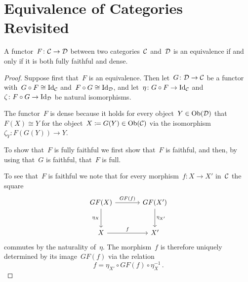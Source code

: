 \section{Equivalence of Categories Revisited}


\begin{theorem}
  A functor~$F \colon \mathcal{C} \to \mathcal{D}$ between two categories~$\mathcal{C}$ and~$\mathcal{D}$ is an equivalence if and only if it is both fully faithful and dense.
\end{theorem}


\begin{proof}
  Suppose first that~$F$ is an equivalence.
  Then let~$G \colon \mathcal{D} \to \mathcal{C}$ be a functor with~$G \circ F \cong \mathrm{Id}_{\mathcal{C}}$ and~$F \circ G \cong \mathrm{Id}_{\mathcal{D}}$, and let~$\eta \colon G \circ F \to \mathrm{Id}_{\mathcal{C}}$ and~$\zeta \colon F \circ G \to \mathrm{Id}_{\mathcal{D}}$ be natural isomorphisms.
  
  The functor~$F$ is dense because it holds for every object~$Y \in \operatorname{Ob}(\mathcal{D})$ that~$F(X) \cong Y$ for the object~$X \coloneqq G(Y) \in \operatorname{Ob}(\mathcal{C})$ via the isomorphism~$\zeta_Y \colon F(G(Y)) \to Y$.
  
  To show that~$F$ is fully faithful we first show that~$F$ is faithful, and then, by using that~$G$ is faithful, that~$F$ is full.
  
  To see that~$F$ is faithful we note that for every morphism~$f \colon X \to X'$ in~$\mathcal{C}$ the square
  \begin{equation}
  \label{diagram for fully faithful}
    \begin{tikzcd}[sep = large]
        GF(X)
        \arrow{r}[above]{GF(f)}
        \arrow{d}[left]{\eta_X}
      & GF(X')
        \arrow{d}[right]{\eta_{X'}}
      \\
        X
        \arrow{r}[above]{f}
      & X'
    \end{tikzcd}
  \end{equation}
  commutes by the naturality of~$\eta$.
  The morphism~$f$ is therefore uniquely determined by its image~$GF(f)$ via the relation
  \[
      f
    = \eta_{X'} \circ GF(f) \circ \eta_X^{-1} \,.
  \]
  

\end{proof}

